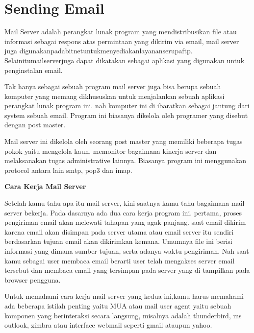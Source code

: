 \section{Sending Email}
	Mail Server adalah perangkat lunak program yang mendistribusikan ﬁle atau informasi sebagai respons atas permintaan yang dikirim via email, mail server juga digunakanpadabitnetuntukmenyediakanlayananserupaftp. Selainitumailserverjuga dapat dikatakan sebagai aplikasi yang digunakan untuk penginstalan email.	\par \vspace{12pt}
	Tak hanya sebagai sebuah program mail server juga bisa berupa sebuah komputer yang memang dikhususkan untuk menjalankan sebuah aplikasi perangkat lunak program ini. nah komputer ini di ibaratkan sebagai jantung dari system sebuah email. Program ini biasanya dikelola oleh programer yang disebut dengan post master.	\par \vspace{12pt}
	Mail server ini dikelola oleh seorang post master yang memiliki beberapa tugas pokok yaitu mengelola kaun, memonitor bagaimana kinerja server dan melaksanakan tugas administrative lainnya. Biasanya program ini menggunakan protocol antara lain smtp, pop3 dan imap.	\par \vspace{12pt}
	
	\textbf{Cara Kerja Mail Server}	\par \vspace{12pt}
	
	Setelah kamu tahu apa itu mail server, kini saatnya kamu tahu bagaimana mail server bekerja. Pada dasarnya ada dua cara kerja program ini. pertama, proses pengiriman email akan melewati tahapan yang agak panjang. saat email dikirim karena email akan disimpan pada server utama atau email server itu sendiri berdasarkan tujuan email akan dikirimkan kemana. Umumnya file ini berisi informasi yang dimana sumber tujuan, serta adanya waktu pengiriman. Nah saat kamu sebagai user membaca email berarti user telah mengakses server email tersebut dan membaca email yang tersimpan pada server yang di tampilkan pada browser pengguna.	\par \vspace{12pt}
	
	Untuk memahami cara kerja mail server yang kedua ini,kamu harus memahami ada beberapa istilah penting yaitu MUA atau mail user agent yaitu sebuah komponen yang berinteraksi secara langsung, misalnya adalah thunderbird, ms outlook, zimbra atau interface webmail seperti gmail ataupun yahoo.	\par \vspace{12pt}
	
